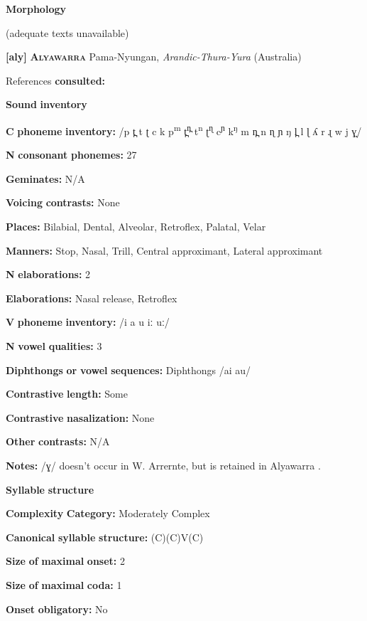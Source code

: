 \textbf{Morphology}

(adequate texts unavailable)

\textbf{[aly]}   \textbf{\textsc{Alyawarra}}  Pama-Nyungan, \textit{Arandic-Thura-Yura} (Australia)

References \textbf{consulted:} \citet{Yallop1977}

\textbf{Sound} \textbf{inventory}

\textbf{C} \textbf{phoneme} \textbf{inventory:} /p t̪ t ʈ c k p\textsuperscript{m} t̪\textsuperscript{n̪} t\textsuperscript{n} ʈ\textsuperscript{ɳ} c\textsuperscript{ɲ} k\textsuperscript{ŋ} m n̪ n ɳ ɲ ŋ l̪ l ɭ ʎ r ɻ w j ɣ̞/

\textbf{N} \textbf{consonant} \textbf{phonemes:} 27

\textbf{Geminates:} N/A

\textbf{Voicing} \textbf{contrasts:} None

\textbf{Places:} Bilabial, Dental, Alveolar, Retroflex, Palatal, Velar

\textbf{Manners:} Stop, Nasal, Trill, Central approximant, Lateral approximant

\textbf{N} \textbf{elaborations:} 2

\textbf{Elaborations:} Nasal release, Retroflex

\textbf{V} \textbf{phoneme} \textbf{inventory:} /i a u iː uː/

\textbf{N} \textbf{vowel} \textbf{qualities:} 3

\textbf{Diphthongs} \textbf{or} \textbf{vowel} \textbf{sequences:} Diphthongs /ai au/

\textbf{Contrastive} \textbf{length:} Some

\textbf{Contrastive} \textbf{nasalization:} None

\textbf{Other} \textbf{contrasts:} N/A

\textbf{Notes:} /ɣ/ doesn’t occur in W. Arrernte, but is retained in Alyawarra \citep[12]{Yallop1977}.

\textbf{Syllable} \textbf{structure}

\textbf{Complexity} \textbf{Category:} Moderately Complex

\textbf{Canonical} \textbf{syllable} \textbf{structure:} (C)(C)V(C) \citep[41-5]{Yallop1977}

\textbf{Size} \textbf{of} \textbf{maximal} \textbf{onset:} 2

\textbf{Size} \textbf{of} \textbf{maximal} \textbf{coda:} 1

\textbf{Onset} \textbf{obligatory:} No

